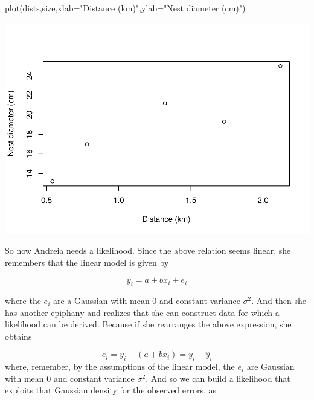 \documentclass[
]{book}
\newenvironment{Shaded}{\begin{snugshade}}{\end{snugshade}}
\newcommand{\AttributeTok}[1]{\textcolor[rgb]{0.77,0.63,0.00}{#1}}
\newcommand{\CommentTok}[1]{\textcolor[rgb]{0.56,0.35,0.01}{\textit{#1}}}
\newcommand{\ControlFlowTok}[1]{\textcolor[rgb]{0.13,0.29,0.53}{\textbf{#1}}}
\newcommand{\DecValTok}[1]{\textcolor[rgb]{0.00,0.00,0.81}{#1}}
\newcommand{\FunctionTok}[1]{\textcolor[rgb]{0.00,0.00,0.00}{#1}}
\newcommand{\NormalTok}[1]{#1}
\newcommand{\OtherTok}[1]{\textcolor[rgb]{0.56,0.35,0.01}{#1}}
\newcommand{\SpecialCharTok}[1]{\textcolor[rgb]{0.00,0.00,0.00}{#1}}
\newcommand{\StringTok}[1]{\textcolor[rgb]{0.31,0.60,0.02}{#1}}
\begin{document}
\begin{Shaded}
\begin{Highlighting}[]
\FunctionTok{plot}\NormalTok{(dists,size,}\AttributeTok{xlab=}\StringTok{"Distance (km)"}\NormalTok{,}\AttributeTok{ylab=}\StringTok{"Nest diameter (cm)"}\NormalTok{)}
\end{Highlighting}
\end{Shaded}

\includegraphics{ECOMODbook_files/figure-latex/ch13.26-1.pdf}

So now Andreia needs a likelihood. Since the above relation seems linear, she remembers that the linear model is given by

\[y_i=a+b x_i+e_i\]

where the \(e_i\) are a Gaussian with mean 0 and constant variance \(\sigma^2\). And then she has another epiphany and realizes that she can construct data for which a likelihood can be derived. Because if she rearranges the above expression, she obtains

\[e_i=y_i-(a+b x_i)=y_i-\hat y_i\]
where, remember, by the assumptions of the linear model, the \(e_i\) are Gaussian with mean 0 and constant variance \(\sigma^2\). And so we can build a likelihood that exploits that Gaussian density for the observed errors, as

\begin{Shaded}
\end{Shaded}
\end{document}
